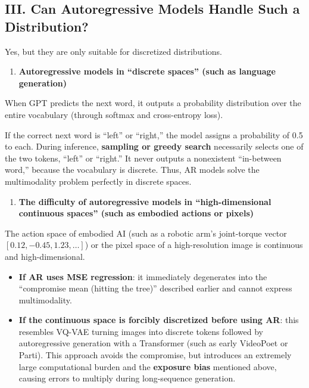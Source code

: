 \hypertarget{iii.-can-autoregressive-models-handle-such-a-distribution}{%
\subsection{III. Can Autoregressive Models Handle Such a Distribution?}\label{iii.-can-autoregressive-models-handle-such-a-distribution}}

Yes, but they are only suitable for discretized distributions.

\begin{enumerate}
\def\labelenumi{\arabic{enumi}.}
\tightlist
\item
  \textbf{Autoregressive models in ``discrete spaces'' (such as language generation)}
\end{enumerate}

When GPT predicts the next word, it outputs a probability distribution over the entire vocabulary (through softmax and cross-entropy loss).

If the correct next word is ``left'' or ``right,'' the model assigns a probability of 0.5 to each. During inference, \textbf{sampling or greedy search} necessarily selects one of the two tokens, ``left'' or ``right.'' It never outputs a nonexistent ``in-between word,'' because the vocabulary is discrete. Thus, AR models solve the multimodality problem perfectly in discrete spaces.

\begin{enumerate}
\def\labelenumi{\arabic{enumi}.}
\setcounter{enumi}{1}
\tightlist
\item
  \textbf{The difficulty of autoregressive models in ``high-dimensional continuous spaces'' (such as embodied actions or pixels)}
\end{enumerate}

The action space of embodied AI (such as a robotic arm's joint-torque vector \([0.12, -0.45, 1.23, \ldots]\)) or the pixel space of a high-resolution image is continuous and high-dimensional.

\begin{itemize}
\tightlist
\item
  \textbf{If AR uses MSE regression}: it immediately degenerates into the ``compromise mean (hitting the tree)'' described earlier and cannot express multimodality.
\item
  \textbf{If the continuous space is forcibly discretized before using AR}: this resembles VQ-VAE turning images into discrete tokens followed by autoregressive generation with a Transformer (such as early VideoPoet or Parti). This approach avoids the compromise, but introduces an extremely large computational burden and the \textbf{exposure bias} mentioned above, causing errors to multiply during long-sequence generation.
\end{itemize}

